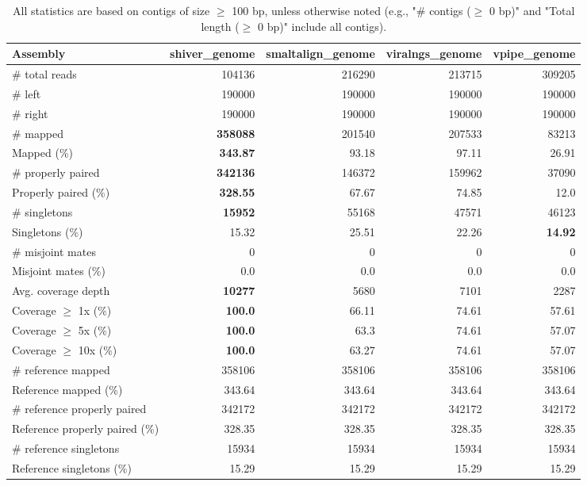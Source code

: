\documentclass[12pt,a4paper]{article}
\begin{document}
\begin{table}[ht]
\begin{center}
\caption{All statistics are based on contigs of size $\geq$ 100 bp, unless otherwise noted (e.g., "\# contigs ($\geq$ 0 bp)" and "Total length ($\geq$ 0 bp)" include all contigs).}
\begin{tabular}{|l*{4}{|r}|}
\hline
Assembly & shiver\_genome & smaltalign\_genome & viralngs\_genome & vpipe\_genome \\ \hline
\# total reads & 104136 & 216290 & 213715 & 309205 \\ \hline
\# left & 190000 & 190000 & 190000 & 190000 \\ \hline
\# right & 190000 & 190000 & 190000 & 190000 \\ \hline
\# mapped & {\bf 358088} & 201540 & 207533 & 83213 \\ \hline
Mapped (\%) & {\bf 343.87} & 93.18 & 97.11 & 26.91 \\ \hline
\# properly paired & {\bf 342136} & 146372 & 159962 & 37090 \\ \hline
Properly paired (\%) & {\bf 328.55} & 67.67 & 74.85 & 12.0 \\ \hline
\# singletons & {\bf 15952} & 55168 & 47571 & 46123 \\ \hline
Singletons (\%) & 15.32 & 25.51 & 22.26 & {\bf 14.92} \\ \hline
\# misjoint mates & 0 & 0 & 0 & 0 \\ \hline
Misjoint mates (\%) & 0.0 & 0.0 & 0.0 & 0.0 \\ \hline
Avg. coverage depth & {\bf 10277} & 5680 & 7101 & 2287 \\ \hline
Coverage $\geq$ 1x (\%) & {\bf 100.0} & 66.11 & 74.61 & 57.61 \\ \hline
Coverage $\geq$ 5x (\%) & {\bf 100.0} & 63.3 & 74.61 & 57.07 \\ \hline
Coverage $\geq$ 10x (\%) & {\bf 100.0} & 63.27 & 74.61 & 57.07 \\ \hline
\# reference mapped & 358106 & 358106 & 358106 & 358106 \\ \hline
Reference mapped (\%) & 343.64 & 343.64 & 343.64 & 343.64 \\ \hline
\# reference properly paired & 342172 & 342172 & 342172 & 342172 \\ \hline
Reference properly paired (\%) & 328.35 & 328.35 & 328.35 & 328.35 \\ \hline
\# reference singletons & 15934 & 15934 & 15934 & 15934 \\ \hline
Reference singletons (\%) & 15.29 & 15.29 & 15.29 & 15.29 \\ \hline

\end{tabular}
\end{center}
\end{table}
\end{document}
